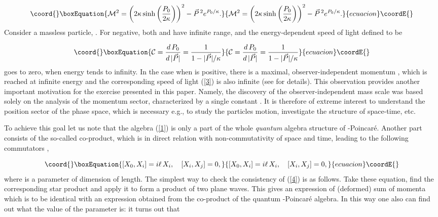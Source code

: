 \documentclass[a4paper,a4paper]{article}
\begin{document}
\begin{equation}\coord{}\boxEquation{\label{2}
  {\cal M}^2 = \left(2\kappa \sinh\left(\frac{P_0}{2\kappa}\right)\right)^2 - \vec{P}\,{}^2 e^{P_0/\kappa}.
}{{\cal M}^2 = \left(2\kappa \sinh\left(\frac{P_0}{2\kappa}\right)\right)^2 - \vec{P}\,{}^2 e^{P_0/\kappa}.
}{ecuacion}\coordE{}\end{equation}
Consider a massless particle, \coordHE{}. For \myHighlight{$\kappa$}\coordHE{} negative, both \coordHE{} and \coordHE{} have infinite range, and the energy-dependent speed of light defined to be

\begin{equation}\coord{}\boxEquation{\label{3}
 {\cal C} = \frac{d\, P_0}{d\, |\vec{P}|} = \frac{1}{1 - |\vec{P}|/\kappa}
}{{\cal C} = \frac{d\, P_0}{d\, |\vec{P}|} = \frac{1}{1 - |\vec{P}|/\kappa}
}{ecuacion}\coordE{}\end{equation}
goes to zero, when energy tends to infinity. In the case when \myHighlight{$\kappa$}\coordHE{} is positive, there is a maximal, observer-independent momentum \coordHE{}, which is reached at infinite energy and the corresponding speed of light (\ref{3}) is also infinite (see \cite{jkgminl, rbgacjkg} for details). This observation provides another important motivation for the exercise presented in this paper. Namely, the discovery of the observer-independent mass scale  was based solely on the analysis of the momentum sector, characterized by a single constant \myHighlight{$\kappa$}\coordHE{}. It is therefore of extreme interest to understand the position sector of the phase space, which is necessary e.g., to study the particles motion, investigate the structure of space-time, etc.

To achieve this goal let us note that the algebra (\ref{1}) is only a part of the whole {\em quantum} algebra structure of \myHighlight{$\kappa$}\coordHE{}-Poincar\'e. Another part consists of the so-called co-product, which is in  direct relation with non-commutativity of space and time, leading to the following commutators  \cite{szak}, \cite{maru}

\begin{equation}\coord{}\boxEquation{\label{4}
 [ X_0, X_i ] = i\ell\, X_i, \quad [ X_i, X_j ] =0,
}{[ X_0, X_i ] = i\ell\, X_i, \quad [ X_i, X_j ] =0,
}{ecuacion}\coordE{}\end{equation}
where \myHighlight{$\ell$}\coordHE{} is a parameter of dimension of length. The simplest way to check the consistency of (\ref{4}) is as follows. Take these equation, find the corresponding star product and apply it to form a product of two plane waves. This gives an expression of (deformed) sum of momenta which is to be identical with an expression obtained from the co-product of the quantum \myHighlight{$\kappa$}\coordHE{}-Poincar\'e algebra. In this way one also can find out what  the value of the parameter \myHighlight{$\ell$}\coordHE{} is:   it turns out that
\end{document}
